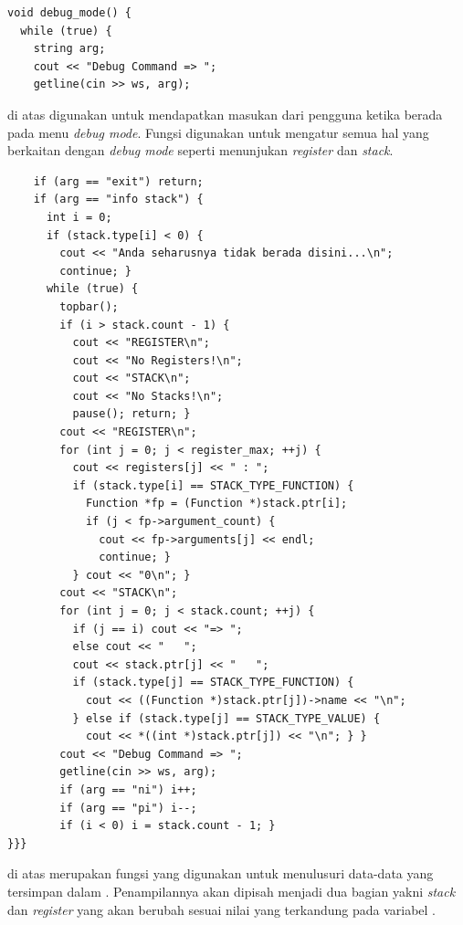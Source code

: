 \documentclass[../main.tex]{subfiles}
\begin{document}
\begin{code}
\begin{verbatim}
void debug_mode() {
  while (true) {
    string arg;
    cout << "Debug Command => ";
    getline(cin >> ws, arg);
\end{verbatim}
\end{code}

{\Script} di atas digunakan untuk mendapatkan masukan dari pengguna ketika berada pada menu \textit{debug mode}. Fungsi  digunakan untuk mengatur semua hal yang berkaitan dengan \textit{debug mode} seperti menunjukan \textit{register} dan \textit{stack}.

\begin{code}
\begin{verbatim}
    if (arg == "exit") return;
    if (arg == "info stack") {
      int i = 0;
      if (stack.type[i] < 0) {
        cout << "Anda seharusnya tidak berada disini...\n";
        continue; }
      while (true) {
        topbar();
        if (i > stack.count - 1) {
          cout << "REGISTER\n";
          cout << "No Registers!\n";
          cout << "STACK\n";
          cout << "No Stacks!\n";
          pause(); return; }
        cout << "REGISTER\n";
        for (int j = 0; j < register_max; ++j) {
          cout << registers[j] << " : ";
          if (stack.type[i] == STACK_TYPE_FUNCTION) {
            Function *fp = (Function *)stack.ptr[i];
            if (j < fp->argument_count) {
              cout << fp->arguments[j] << endl;
              continue; }
          } cout << "0\n"; }
        cout << "STACK\n";
        for (int j = 0; j < stack.count; ++j) {
          if (j == i) cout << "=> ";
          else cout << "   ";
          cout << stack.ptr[j] << "   ";
          if (stack.type[j] == STACK_TYPE_FUNCTION) {
            cout << ((Function *)stack.ptr[j])->name << "\n";
          } else if (stack.type[j] == STACK_TYPE_VALUE) {
            cout << *((int *)stack.ptr[j]) << "\n"; } }
        cout << "Debug Command => ";
        getline(cin >> ws, arg);
        if (arg == "ni") i++;
        if (arg == "pi") i--;
        if (i < 0) i = stack.count - 1; }
}}}
\end{verbatim}
\end{code}

{\Script} di atas merupakan fungsi yang digunakan untuk menulusuri data-data yang tersimpan dalam . Penampilannya akan dipisah menjadi dua bagian yakni \textit{stack} dan \textit{register} yang akan berubah sesuai nilai yang terkandung pada variabel .
\end{document}
